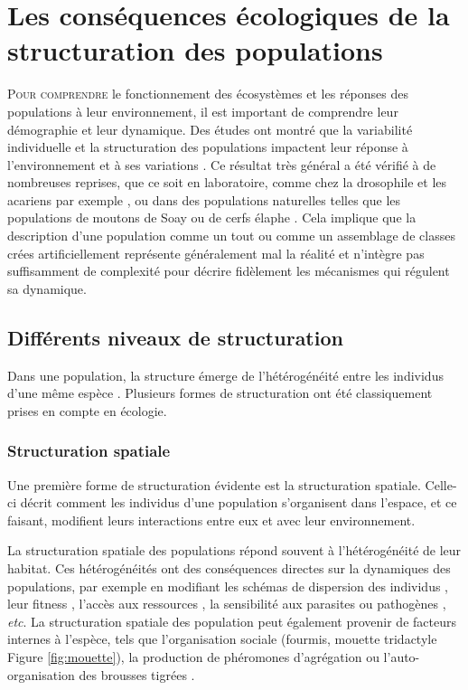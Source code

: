 \section{Les conséquences écologiques de la
structuration des populations}

\lettrine[lines=3]{P}{our comprendre} le fonctionnement des écosystèmes et les
réponses des populations à leur environnement, il est important de comprendre
leur démographie et leur dynamique. Des études ont montré que la variabilité
individuelle et la structuration des populations impactent leur réponse à
l'environnement et à ses variations \autocites{benton2005a}.
Ce résultat très général a été vérifié à de nombreuses reprises, que ce soit en
laboratoire, comme chez la drosophile \autocites{madalena1974a} et les acariens
par exemple \autocites{benton2005a}, ou dans des populations naturelles telles
que les populations de moutons de Soay \autocites{coulson2001a,ozgul2009a} ou de
cerfs élaphe \autocites{langvatn1999a}.
Cela implique que la description d'une population comme un tout ou comme un
assemblage de classes crées artificiellement représente généralement mal la
réalité et n'intègre pas suffisamment de complexité pour décrire fidèlement les
mécanismes qui régulent sa dynamique.

\subsection{Différents niveaux de structuration}

Dans une population, la structure émerge de l'hétérogénéité entre les
individus d'une même espèce \autocites{benton2006a}. Plusieurs formes de
structuration ont été classiquement prises en compte en écologie.

\subsubsection{Structuration spatiale}

Une première forme de structuration évidente est la structuration spatiale.
Celle-ci décrit comment les individus d'une population s'organisent dans
l'espace, et ce faisant, modifient leurs interactions entre eux et avec leur environnement. 

La structuration spatiale des populations répond souvent à l'hétérogénéité de
leur habitat. Ces hétérogénéités ont des conséquences directes sur la dynamiques
des populations, par exemple en modifiant les schémas de dispersion des
individus \autocites{hiebeler2000a}, leur fitness \autocites{zajkac2008a},
l'accès aux ressources \autocites{burger2008a}, la sensibilité aux parasites ou
pathogènes \autocites{su2009a}, \textit{etc}. La structuration spatiale des
population peut également provenir de facteurs internes à l'espèce, tels que
l'organisation sociale (fourmis, mouette tridactyle Figure \ref{fig:mouette}),
la production de phéromones d'agrégation
\autocites[Collemboles][]{joosse1974aggregational,manica2001aggregation} ou
l'auto-organisation des brousses tigrées
\autocites[Figure \ref{fig:mouette}][]{deblauwe2008global}.

